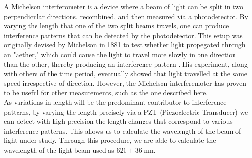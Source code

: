 A Michelson interferometer is a device where a beam of light can be split in two perpendicular directions, recombined, and then measured via a photodetector. By varying the length that one of the two split beams travels, one can produce interference patterns that can be detected by the photodetector. This setup was originally devised by Michelson in 1881 to test whether light propegated through an "aether," which could cause the light to travel more slowly in one direction than the other, thereby producing an interference pattern \cite{michelson}. His experiment, along with others of the time period, eventually showed that light travelled at the same speed irrespective of direction. However, the  Michelson interferemoter has proven to be useful for other measurements, such as the one described here.
  \\
  As variations in length will be the predominant contributor to interference patterns, by varying the length precisely via a PZT (Piezoelectric Transducer) we can detect with high precision the length changes that correspond to various interference patterns. This allows us to calculate the wavelength of the beam of light under study. Through this procedure, we are able to calculate the wavelength of the light beam used as $620 \pm 36$ nm.
  \\
